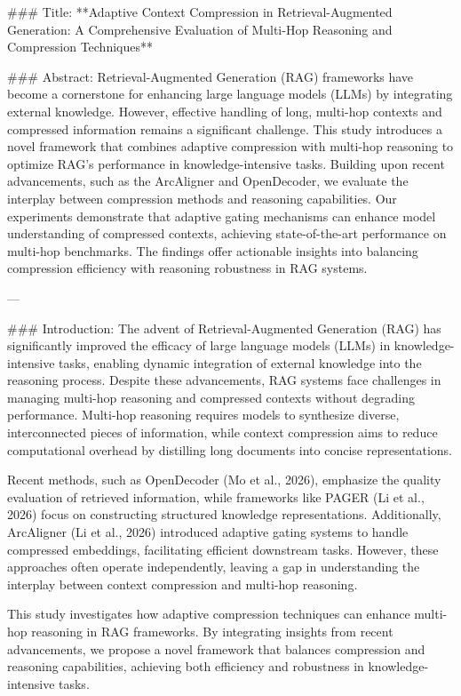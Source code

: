 ### Title:
**Adaptive Context Compression in Retrieval-Augmented Generation: A Comprehensive Evaluation of Multi-Hop Reasoning and Compression Techniques**

### Abstract:
Retrieval-Augmented Generation (RAG) frameworks have become a cornerstone for enhancing large language models (LLMs) by integrating external knowledge. However, effective handling of long, multi-hop contexts and compressed information remains a significant challenge. This study introduces a novel framework that combines adaptive compression with multi-hop reasoning to optimize RAG's performance in knowledge-intensive tasks. Building upon recent advancements, such as the ArcAligner and OpenDecoder, we evaluate the interplay between compression methods and reasoning capabilities. Our experiments demonstrate that adaptive gating mechanisms can enhance model understanding of compressed contexts, achieving state-of-the-art performance on multi-hop benchmarks. The findings offer actionable insights into balancing compression efficiency with reasoning robustness in RAG systems.

---

### Introduction:
The advent of Retrieval-Augmented Generation (RAG) has significantly improved the efficacy of large language models (LLMs) in knowledge-intensive tasks, enabling dynamic integration of external knowledge into the reasoning process. Despite these advancements, RAG systems face challenges in managing multi-hop reasoning and compressed contexts without degrading performance. Multi-hop reasoning requires models to synthesize diverse, interconnected pieces of information, while context compression aims to reduce computational overhead by distilling long documents into concise representations.

Recent methods, such as OpenDecoder (Mo et al., 2026), emphasize the quality evaluation of retrieved information, while frameworks like PAGER (Li et al., 2026) focus on constructing structured knowledge representations. Additionally, ArcAligner (Li et al., 2026) introduced adaptive gating systems to handle compressed embeddings, facilitating efficient downstream tasks. However, these approaches often operate independently, leaving a gap in understanding the interplay between context compression and multi-hop reasoning.

This study investigates how adaptive compression techniques can enhance multi-hop reasoning in RAG frameworks. By integrating insights from recent advancements, we propose a novel framework that balances compression and reasoning capabilities, achieving both efficiency and robustness in knowledge-intensive tasks.

